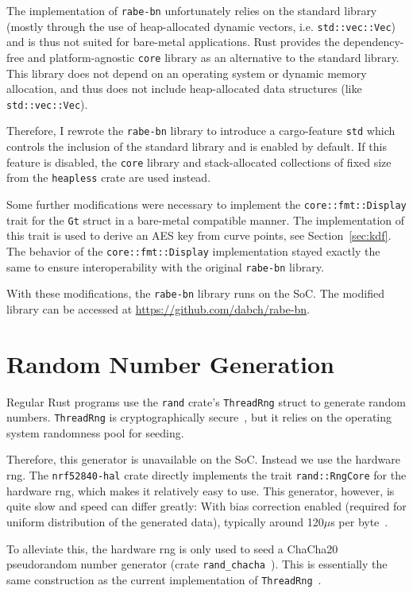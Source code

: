 The implementation of \texttt{rabe-bn} unfortunately relies on the standard library (mostly through the use of heap-allocated dynamic vectors, i.e. \texttt{std::vec::Vec}) and is thus not suited for bare-metal applications.
Rust provides the dependency-free and platform-agnostic \texttt{core} library as an alternative to the standard library.
This library does not depend on an operating system or dynamic memory allocation, and thus does not include heap-allocated data structures (like \texttt{std::vec::Vec}).

Therefore, I rewrote the \texttt{rabe-bn} library to introduce a cargo-feature \texttt{std} which controls the inclusion of the standard library and is enabled by default.
If this feature is disabled, the \texttt{core} library and stack-allocated collections of fixed size from the \texttt{heapless} crate are used instead.

Some further modifications were necessary to implement the \texttt{core::fmt::Display} trait for the \texttt{Gt} struct in a bare-metal compatible manner.
The implementation of this trait is used to derive an AES key from curve points, see Section~\ref{sec:kdf}.
The behavior of the \texttt{core::fmt::Display} implementation stayed exactly the same to ensure interoperability with the original \texttt{rabe-bn} library.

With these modifications, the \texttt{rabe-bn} library runs on the SoC.
The modified library can be accessed at \url{https://github.com/dabch/rabe-bn}.

\section{Random Number Generation}
Regular Rust programs use the \texttt{rand} \gls{crate}'s \verb+ThreadRng+ struct to generate random numbers.
\texttt{ThreadRng} is cryptographically secure~\cite{noauthor_rust_nodate}, but it relies on the operating system randomness pool for seeding.

Therefore, this generator is unavailable on the SoC.
Instead we use the hardware \acrshort{rng}.
The \texttt{nrf52840-hal} crate directly implements the trait \texttt{rand::RngCore} for the hardware \acrshort{rng}, which makes it relatively easy to use.
This generator, however, is quite slow and speed can differ greatly: With bias correction enabled (required for uniform distribution of the generated data), typically around 120$\mu$s per byte~\cite{nordic_semiconductor_nrf52840_nodate}.

To alleviate this, the hardware \acrshort{rng} is only used to seed a ChaCha20 pseudorandom number generator (crate \texttt{rand\_chacha}~\cite{noauthor_rand_chacha_nodate}).
This is essentially the same construction as the current implementation of \texttt{ThreadRng}~\cite{noauthor_rust_nodate}.

